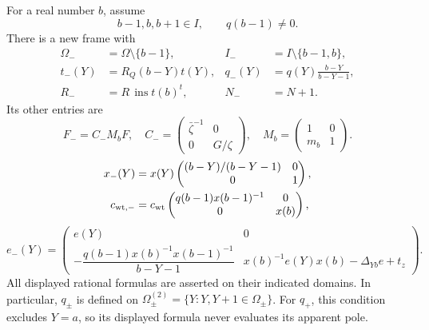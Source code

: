 \begin{theorem}
For a real number \(b\), assume
\begin{equation}
             b-1,b,b+1\in I,\qquad q(b-1)\ne0.  \label{re-minus-hyp}
\end{equation}
There is a new frame with
\begin{equation}
 \begin{aligned}
 \Omega_-&=\Omega\setminus\{b-1\},&
 I_-&=I\setminus\{b-1,b\},\\
 t_-(Y)&=R_Q(b-Y)t(Y),&
 q_-(Y)&=q(Y)\frac{b-Y}{b-Y-1},\\
 R_-&=R\,\operatorname{ins}t(b)^t,&
 N_-&=N+1.
 \end{aligned}                                                   \label{re-minus-module}
\end{equation}
Its other entries are
\begin{equation}
 F_-=C_-M_bF,\quad
 C_-=\begin{pmatrix}\bar\zeta^{-1}&0\\0&G/\zeta\end{pmatrix},\quad
 M_b=\begin{pmatrix}1&0\\m_b&1\end{pmatrix}.                  \label{re-minus-F}
\end{equation}
\begin{align}
 x_-(Y)&=x(Y)
       \begin{pmatrix}(b-Y)/(b-Y-1)&0\\0&1\end{pmatrix},\nonumber\\
 c_{{\rm wt},-}&=c_{\rm wt}
       \begin{pmatrix}q(b-1)x(b-1)^{-1}&0\\0&x(b)\end{pmatrix},
                                                               \label{re-minus-xc}
\end{align}
\begin{equation}
 e_-(Y)=
 \begin{pmatrix}
 e(Y)&0\\
 -\dfrac{q(b-1)x(b)^{-1}x(b-1)^{-1}}{b-Y-1}
       &x(b)^{-1}e(Y)x(b)-\Delta_{Yb}e+t_z
 \end{pmatrix}.                                  \label{re-minus-e}
\end{equation}
All displayed rational formulas are asserted on their indicated
domains.  In particular, \(q_\pm\) is defined on
\(\Omega_\pm^{(2)}=\{Y:Y,Y+1\in\Omega_\pm\}\).
For \(q_+\), this condition excludes \(Y=a\), so its displayed
formula never evaluates its apparent pole.
\end{theorem}

